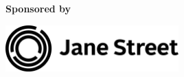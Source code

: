 \documentclass[11pt, a4paper]{article}
\begin{document}
\vspace{0.6in}

\begin{center}
    \Large
\textbf{Sponsored by}

\vspace{0.15in}

\includegraphics[width=0.5\textwidth]{jane-street-logo}
\end{center}
\clearpage















\end{document}
